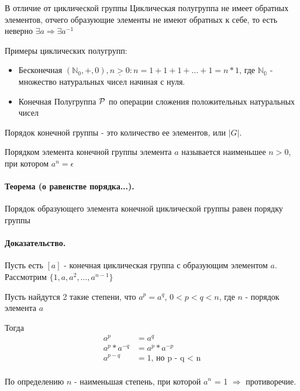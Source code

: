 \documentclass{report}
\begin{document}
В отличие от циклической группы Циклическая полугруппа не имеет обратных элементов, отчего
образующие элементы не имеют обратных к себе, то есть неверно $\exists a \Rightarrow \exists a^{-1}$

\medskip

Примеры циклических полугрупп:
\begin{itemize}
	\item Бесконечная\newline
	      $(\mathbb{N}_0, +, 0), \underline{n > 0}: n = 1 + 1 + 1 + \ldots + 1 = n * 1$,
	      где $\mathbb{N_{0}}$ - множество натуральных чисел начиная с нуля.
	\item Конечная\newline
	      Полугруппа $\cal P$ по операции сложения положительных натуральных чисел
\end{itemize}

\medskip

Порядок конечной группы - это количество ее элементов, или $|G|$.

\medskip

Порядком элемента конечной группы элемента $a$ называется наименьшее $n > 0$, при котором
$a^{n} = \epsilon$

\paragraph*{Теорема (о равенстве порядка...).}
Порядок образующего элемента конечной циклической группы равен порядку группы
\paragraph*{Доказательство.}
Пусть есть $[a]$ - конечная циклическая группа с образующим элементом $a$.
Рассмотрим $\{1,a,a^{2},\ldots, a^{n-1}\}$

Пусть найдутся 2 такие степени, что $a^{p} = a^{q}$, $0 < p < q < n$, где $n$ - порядок элемента $a$

Тогда
\begin{align*}
	a^{p}          & = a^{q}                   \\
	a^{p} * a^{-q} & = a^{p} * a^{-p}          \\
	a^{p-q}        & = 1 \mbox{, но p - q < n} \\
\end{align*}

По определению $n$ - наименьшая степень, при которой $a^{n}$ = 1 $\Rightarrow$ противоречие.

\newpage
\end{document}

